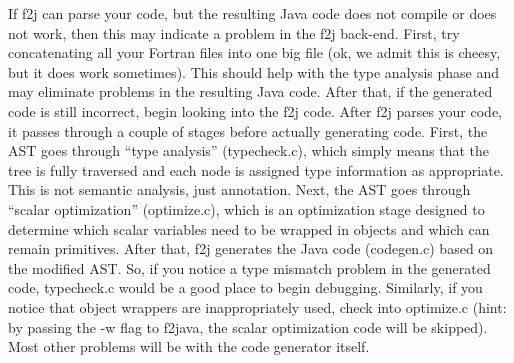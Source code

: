 \documentclass[11pt]{article}
\begin{document}
If f2j can parse your code, but the resulting Java code does not compile or
does not work, then this may indicate a problem in the f2j back-end. First, try
concatenating all your Fortran files into one big file (ok, we admit this is
cheesy, but it does work sometimes). This should help with the type analysis
phase and may eliminate problems in the resulting Java code. After that, if the
generated code is still incorrect, begin looking into the f2j code. After f2j
parses your code, it passes through a couple of stages before actually
generating code.  First, the AST goes through ``type analysis'' (typecheck.c),
which simply means that the tree is fully traversed and each node is assigned
type information as appropriate. This is not semantic analysis, just
annotation. Next, the AST goes through ``scalar optimization'' (optimize.c),
which is an optimization stage designed to determine which scalar variables
need to be wrapped in objects and which can remain primitives. After that, f2j
generates the Java code (codegen.c) based on the modified AST. So, if you
notice a type mismatch problem in the generated code, typecheck.c would be a
good place to begin debugging. Similarly, if you notice that object wrappers
are inappropriately used, check into optimize.c (hint: by passing the -w flag
to f2java, the scalar optimization code will be skipped). Most other problems
will be with the code generator itself.
\end{document}
